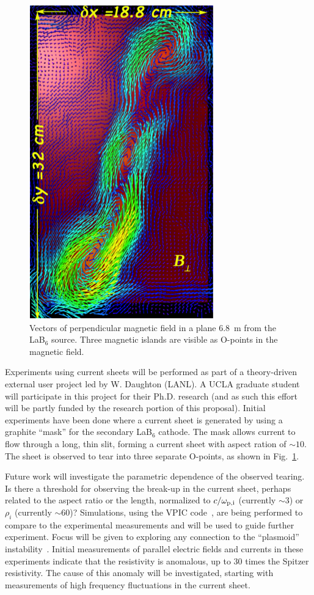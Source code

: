 \documentclass[11pt]{article}
\renewcommand{\cite}{\citep}
\begin{document}
\begin{figure}
\begin{center}
\includegraphics[width=3.0truein]{tearing}
\caption{Vectors of perpendicular magnetic field in a plane 6.8~m from
  the LaB$_6$ source.  Three magnetic islands are visible as O-points
  in the magnetic field.}\label{tearing}
\end{center}
\end{figure}
 
Experiments using current sheets will be performed as part of a
theory-driven external user project led by W. Daughton (LANL).  A UCLA
graduate student will participate in this project for their
Ph.D. research (and as such this effort will be partly funded by the research
portion of this proposal).   Initial experiments have been done where
a current sheet is generated by using a graphite ``mask'' for the
secondary LaB$_6$ cathode.  The mask allows current to flow through a
long, thin slit, forming a current sheet with aspect ration of $\sim
10$. The sheet is observed to tear into three separate O-points, as
shown in Fig.~\ref{tearing}.


Future work will investigate the parametric dependence of the observed
tearing.  Is there a threshold for observing the break-up in the
current sheet, perhaps related to the aspect ratio or the length,
normalized to $c/\omega_{\rm p,i}$ (currently $\sim 3$) or $\rho_i$
(currently $\sim 60$)?  Simulations, using the VPIC code~\cite{bowers:2009}, are being
performed to compare to the experimental measurements and will be used
to guide further experiment. Focus will be given to exploring any
connection to the ``plasmoid''
instability~\cite{loureiro:2007,daughton:2009}.   Initial measurements
of parallel electric fields and currents in these experiments indicate
that the resistivity is anomalous, up to 30 times the Spitzer
resistivity.  The cause of this anomaly will be investigated, starting
with measurements of high frequency fluctuations in the current sheet.    
\end{document}
